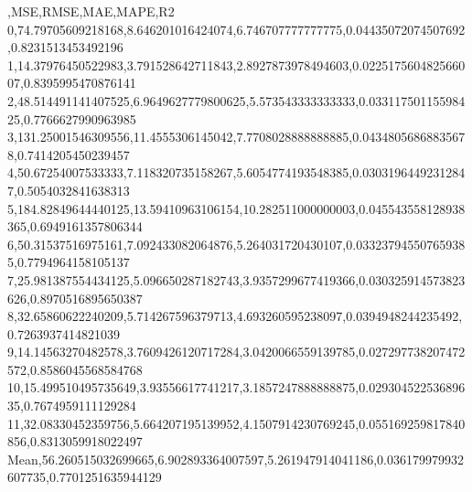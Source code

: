 ,MSE,RMSE,MAE,MAPE,R2
0,74.79705609218168,8.646201016424074,6.746707777777775,0.04435072074507692,0.8231513453492196
1,14.37976450522983,3.791528642711843,2.8927873978494603,0.022517560482566007,0.8395995470876141
2,48.514491141407525,6.9649627779800625,5.573543333333333,0.03311750115598425,0.7766627990963985
3,131.25001546309556,11.4555306145042,7.7708028888888885,0.04348056868835678,0.7414205450239457
4,50.67254007533333,7.118320735158267,5.6054774193548385,0.03031964492312847,0.5054032841638313
5,184.82849644440125,13.59410963106154,10.282511000000003,0.045543558128938365,0.6949161357806344
6,50.31537516975161,7.092433082064876,5.264031720430107,0.033237945507659385,0.7794964158105137
7,25.981387554434125,5.096650287182743,3.9357299677419366,0.030325914573823626,0.8970516895650387
8,32.65860622240209,5.714267596379713,4.693260595238097,0.0394948244235492,0.7263937414821039
9,14.14563270482578,3.7609426120717284,3.0420066559139785,0.027297738207472572,0.8586045568584768
10,15.499510495735649,3.93556617741217,3.1857247888888875,0.02930452253689635,0.7674959111129284
11,32.08330452359756,5.664207195139952,4.1507914230769245,0.055169259817840856,0.8313059918022497
Mean,56.260515032699665,6.902893364007597,5.261947914041186,0.036179979932607735,0.7701251635944129
